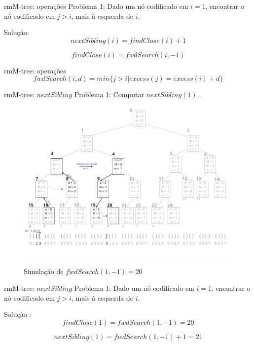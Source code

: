 \begin{frame}{rmM-tree: operações}
    Problema 1: Dado um nó codificado em $i=1$, encontrar o nó codificado em $j>i$, mais à esquerda de $i$.


    Solução: 
    $$nextSibling(i) = findClose(i) +1$$ 


    $$findClose(i) = fwdSearch(i,-1)$$ 
 \end{frame}

 \begin{frame}{rmM-tree: operações}
    $$fwdSearch(i,d) = min\{ j > i | excess(j) = excess(i) + d \}$$ 
 \end{frame}

 \begin{frame}{rmM-tree: $nextSibling$}
    Problema 1: Computar $nextSibling(1)$.
     \begin{figure}[h!]
         \centering
         \includegraphics[scale=0.27]{images/rmm-tree-bin-fwdSearch.png}\\
         \caption{Simulação de $fwdSearch(1,-1)=20$}
     \end{figure} 
 \end{frame}

 \begin{frame}{rmM-tree: $nextSibling$}
    Problema 1: Dado um nó codificado em $i=1$, encontrar o nó codificado em $j>i$, mais à esquerda de $i$.


    Solução : 
    $$findClose(1) = fwdSearch(1,-1) = 20 $$ 



    $$nextSibling(1) = fwdSearch(1,-1) + 1 = 21 $$ 
 \end{frame}

